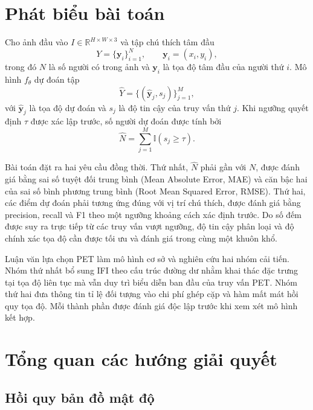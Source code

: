 \section{Phát biểu bài toán}

Cho ảnh đầu vào $I\in\mathbb{R}^{H\times W\times 3}$ và tập chú thích tâm đầu
\begin{equation}
    Y=\{\mathbf y_i\}_{i=1}^{N},
    \qquad \mathbf y_i=(x_i,y_i),
\end{equation}
trong đó $N$ là số người có trong ảnh và $\mathbf y_i$ là tọa độ tâm đầu của người thứ $i$. Mô hình $f_{\theta}$ dự đoán tập
\begin{equation}
    \widehat{Y}=\{(\widehat{\mathbf y}_j,s_j)\}_{j=1}^{M},
\end{equation}
với $\widehat{\mathbf y}_j$ là tọa độ dự đoán và $s_j$ là độ tin cậy của truy vấn thứ $j$. Khi ngưỡng quyết định $\tau$ được xác lập trước, số người dự đoán được tính bởi
\begin{equation}
    \widehat N=\sum_{j=1}^{M}\mathbb I(s_j\geq\tau).
\end{equation}

Bài toán đặt ra hai yêu cầu đồng thời. Thứ nhất, $\widehat N$ phải gần với $N$, được đánh giá bằng sai số tuyệt đối trung bình (Mean Absolute Error, MAE) và căn bậc hai của sai số bình phương trung bình (Root Mean Squared Error, RMSE). Thứ hai, các điểm dự đoán phải tương ứng đúng với vị trí chú thích, được đánh giá bằng precision, recall và F1 theo một ngưỡng khoảng cách xác định trước. Do số đếm được suy ra trực tiếp từ các truy vấn vượt ngưỡng, độ tin cậy phân loại và độ chính xác tọa độ cần được tối ưu và đánh giá trong cùng một khuôn khổ.

Luận văn lựa chọn PET làm mô hình cơ sở và nghiên cứu hai nhóm cải tiến. Nhóm thứ nhất bổ sung IFI theo cấu trúc đường dư nhằm khai thác đặc trưng tại tọa độ liên tục mà vẫn duy trì biểu diễn ban đầu của truy vấn PET. Nhóm thứ hai đưa thông tin tỉ lệ đối tượng vào chi phí ghép cặp và hàm mất mát hồi quy tọa độ. Mỗi thành phần được đánh giá độc lập trước khi xem xét mô hình kết hợp.

\section{Tổng quan các hướng giải quyết}

\subsection{Hồi quy bản đồ mật độ}

